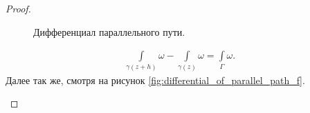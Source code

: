 \documentclass[../complex-analysis.tex]{subfiles}
\begin{document}
\begin{proof}
\begin{itemize}
\begin{figure}[ht]
    \centering
    \caption{Дифференциал параллельного пути.}
    \label{fig:differential_of_parallel_path_f}
\end{figure}

  \begin{align*}
   \int\limits_{\gamma(z+h)}  \omega - \int\limits_{\gamma(z)}  \omega = \int\limits_{\Gamma} \omega. 
  \end{align*} Далее так же, смотря на рисунок \eqref{fig:differential_of_parallel_path_f}.
 \end{itemize}
\end{proof}
\end{document}
